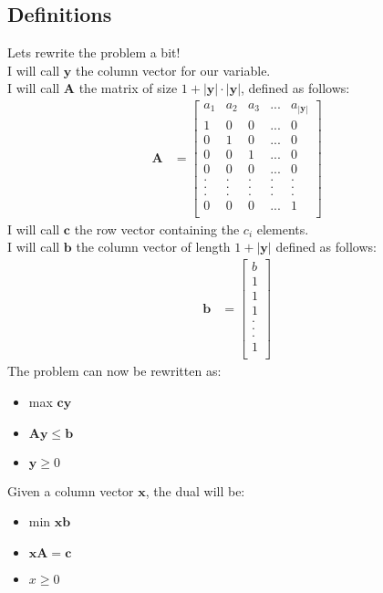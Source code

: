 \documentclass[1pt]{article}
\begin{document}
	\subsection{Definitions} 
	Lets rewrite the problem a bit!\\
	I will call $\boldsymbol y$ the column vector for our variable.\\
	I will call $\boldsymbol A$ the matrix of size $1 + |\boldsymbol y| \cdot |\boldsymbol y|$, defined as follows:
	\begin{align}
	\boldsymbol A &= \begin{bmatrix}
			a_1 & a_2 & a_3 & ... & a_{|\boldsymbol y|} \\
			1 & 0 & 0 & ... & 0 \\
			0 & 1 & 0 & ... & 0 \\
			0 & 0 & 1 & ... & 0 \\
			0 & 0 & 0 & ... & 0 \\
			. & . & . & . & .\\
			. & . & . & . & .\\
			. & . & . & . & .\\
			0 & 0 & 0 & ... & 1 \\
	     \end{bmatrix}
	\end{align}
	I will call $\boldsymbol c$ the row vector containing the $c_i$ elements.\\
	I will call $\boldsymbol b$ the column vector of length $1+|\boldsymbol y|$ defined as follows:
	\begin{align}
	\boldsymbol b &= \begin{bmatrix}
			b \\
			1   \\
			1   \\
			1   \\
			.   \\
			.   \\
			.   \\
			1   \\
	     \end{bmatrix}
	\end{align}
	The problem can now be rewritten as:
	\begin{itemize}
		\item max $\boldsymbol{cy}$
		\item $\boldsymbol{Ay} \leqslant \boldsymbol{b}$
		\item $\boldsymbol{y} \geqslant 0$ 
	\end{itemize}
	Given a column vector $\boldsymbol x$, the dual will be:
	\begin{itemize}
		\item min $\boldsymbol{xb}$
		\item $\boldsymbol{xA} = \boldsymbol{c}$
		\item $x \geqslant 0$
	\end{itemize}
\newpage
\end{document}
